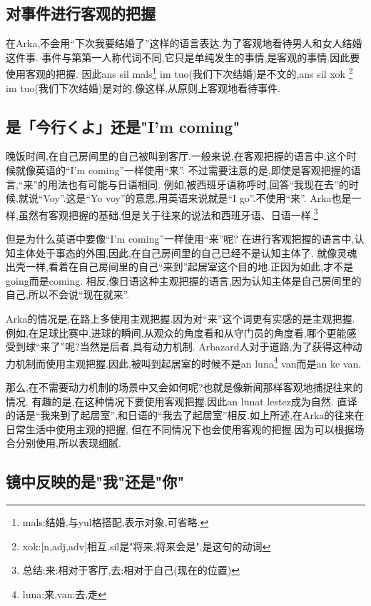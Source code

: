 \subsection{对事件进行客观的把握}

在Arka,不会用``下次我要结婚了''这样的语言表达.为了客观地看待男人和女人结婚这件事.
事件与第第一人称代词不同,它只是单纯发生的事情,是客观的事情.因此要使用客观的把握.
因此ans sil mals\footnote{mals:结婚,与yul格搭配,表示对象,可省略.} im tuo(我们下次结婚)是不文的,ans sil xok
\footnote{xok:[n,adj,adv]相互.sil是"将来,将来会是",是这句的动词} im tuo(我们下次结婚)是对的.像这样,从原则上客观地看待事件.
\subsection{是「今行くよ」还是"I'm coming"}
晚饭时间,在自己房间里的自己被叫到客厅.一般来说,在客观把握的语言中,这个时候就像英语的``I'm coming''一样使用``来''.
不过需要注意的是,即使是客观把握的语言,``来''的用法也有可能与日语相同.
例如,被西班牙语称呼时,回答``我现在去''的时候,就说``Voy''.这是``Yo voy''的意思,用英语来说就是``I go''.不使用``来''.
Arka也是一样,虽然有客观把握的基础,但是关于往来的说法和西班牙语、日语一样.\footnote{总结:\quad 来:相对于客厅,去:相对于自己(现在的位置)}

但是为什么英语中要像``I'm coming''一样使用``来''呢?
在进行客观把握的语言中,认知主体处于事态的外围,因此,在自己房间里的自己已经不是认知主体了.
就像灵魂出壳一样,看着在自己房间里的自己``来到''起居室这个目的地.正因为如此,才不是going而是coming.
相反,像日语这种主观把握的语言,因为认知主体是自己房间里的自己,所以不会说``现在就来''.

Arka的情况是,在路上多使用主观把握.因为对``来''这个词更有实感的是主观把握.
例如,在足球比赛中,进球的瞬间,从观众的角度看和从守门员的角度看,哪个更能感受到球``来了''呢?当然是后者,具有动力机制.
Arbazard人对于道路,为了获得这种动力机制而使用主观把握.因此,被叫到起居室的时候不是an luna\footnote{luna:来,van:去,走} van而是an ke van.

那么,在不需要动力机制的场景中又会如何呢?也就是像新闻那样客观地捕捉往来的情况.
有趣的是,在这种情况下要使用客观把握.因此an lunat lestez成为自然.
直译的话是``我来到了起居室'',和日语的``我去了起居室''相反.如上所述,在Arka的往来在日常生活中使用主观的把握,
但在不同情况下也会使用客观的把握.因为可以根据场合分别使用,所以表现细腻.

\subsection{镜中反映的是"我"还是"你"}

